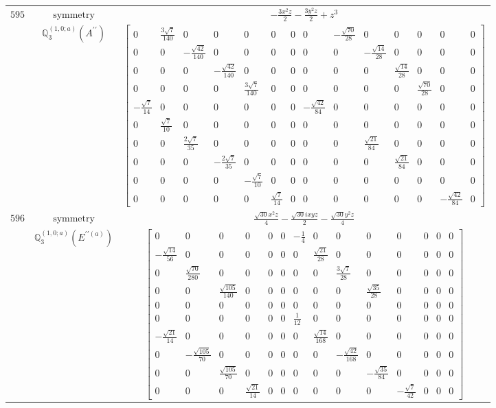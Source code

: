 \documentclass[fleqn,8pt,landscape]{jsarticle}
\begin{document}
\begin{longtable}{ccc}
$ 595 $ & $ \text{symmetry} $ & $ - \frac{3 x^{2} z}{2} - \frac{3 y^{2} z}{2} + z^{3} $ \\
$  $ & $ \mathbb{Q}_{3}^{(1,0;a)}(A^{\prime\prime}) $ & $ \begin{bmatrix} 0 & \frac{3 \sqrt{7}}{140} & 0 & 0 & 0 & 0 & 0 & 0 & - \frac{\sqrt{70}}{28} & 0 & 0 & 0 & 0 & 0 \\ 0 & 0 & - \frac{\sqrt{42}}{140} & 0 & 0 & 0 & 0 & 0 & 0 & - \frac{\sqrt{14}}{28} & 0 & 0 & 0 & 0 \\ 0 & 0 & 0 & - \frac{\sqrt{42}}{140} & 0 & 0 & 0 & 0 & 0 & 0 & \frac{\sqrt{14}}{28} & 0 & 0 & 0 \\ 0 & 0 & 0 & 0 & \frac{3 \sqrt{7}}{140} & 0 & 0 & 0 & 0 & 0 & 0 & \frac{\sqrt{70}}{28} & 0 & 0 \\ - \frac{\sqrt{7}}{14} & 0 & 0 & 0 & 0 & 0 & 0 & - \frac{\sqrt{42}}{84} & 0 & 0 & 0 & 0 & 0 & 0 \\ 0 & \frac{\sqrt{7}}{10} & 0 & 0 & 0 & 0 & 0 & 0 & 0 & 0 & 0 & 0 & 0 & 0 \\ 0 & 0 & \frac{2 \sqrt{7}}{35} & 0 & 0 & 0 & 0 & 0 & 0 & \frac{\sqrt{21}}{84} & 0 & 0 & 0 & 0 \\ 0 & 0 & 0 & - \frac{2 \sqrt{7}}{35} & 0 & 0 & 0 & 0 & 0 & 0 & \frac{\sqrt{21}}{84} & 0 & 0 & 0 \\ 0 & 0 & 0 & 0 & - \frac{\sqrt{7}}{10} & 0 & 0 & 0 & 0 & 0 & 0 & 0 & 0 & 0 \\ 0 & 0 & 0 & 0 & 0 & \frac{\sqrt{7}}{14} & 0 & 0 & 0 & 0 & 0 & 0 & - \frac{\sqrt{42}}{84} & 0 \end{bmatrix} $ \\ \hline
$ 596 $ & $ \text{symmetry} $ & $ \frac{\sqrt{30} x^{2} z}{4} - \frac{\sqrt{30} i x y z}{2} - \frac{\sqrt{30} y^{2} z}{4} $ \\
$  $ & $ \mathbb{Q}_{3}^{(1,0;a)}(E^{\prime\prime(a)}) $ & $ \begin{bmatrix} 0 & 0 & 0 & 0 & 0 & 0 & - \frac{1}{4} & 0 & 0 & 0 & 0 & 0 & 0 & 0 \\ - \frac{\sqrt{14}}{56} & 0 & 0 & 0 & 0 & 0 & 0 & \frac{\sqrt{21}}{28} & 0 & 0 & 0 & 0 & 0 & 0 \\ 0 & \frac{\sqrt{70}}{280} & 0 & 0 & 0 & 0 & 0 & 0 & \frac{3 \sqrt{7}}{28} & 0 & 0 & 0 & 0 & 0 \\ 0 & 0 & \frac{\sqrt{105}}{140} & 0 & 0 & 0 & 0 & 0 & 0 & \frac{\sqrt{35}}{28} & 0 & 0 & 0 & 0 \\ 0 & 0 & 0 & 0 & 0 & 0 & 0 & 0 & 0 & 0 & 0 & 0 & 0 & 0 \\ 0 & 0 & 0 & 0 & 0 & 0 & \frac{1}{12} & 0 & 0 & 0 & 0 & 0 & 0 & 0 \\ - \frac{\sqrt{21}}{14} & 0 & 0 & 0 & 0 & 0 & 0 & \frac{\sqrt{14}}{168} & 0 & 0 & 0 & 0 & 0 & 0 \\ 0 & - \frac{\sqrt{105}}{70} & 0 & 0 & 0 & 0 & 0 & 0 & - \frac{\sqrt{42}}{168} & 0 & 0 & 0 & 0 & 0 \\ 0 & 0 & \frac{\sqrt{105}}{70} & 0 & 0 & 0 & 0 & 0 & 0 & - \frac{\sqrt{35}}{84} & 0 & 0 & 0 & 0 \\ 0 & 0 & 0 & \frac{\sqrt{21}}{14} & 0 & 0 & 0 & 0 & 0 & 0 & - \frac{\sqrt{7}}{42} & 0 & 0 & 0 \end{bmatrix} $ \\ \hline

\end{longtable}
\end{document}
